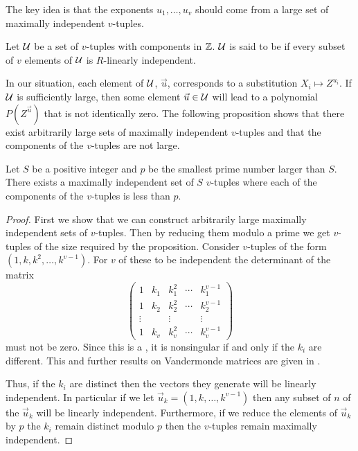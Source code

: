The key idea is that the exponents $u_1, \ldots, u_v$ should come from a
large set of maximally independent $v$-tuples.

\begin{definition}
Let $\cal U$ be a set of $v$-tuples with components in $\mathbb{Z}$.
$\cal U$ is said to be  if every subset of
$v$ elements of $\cal U$ is $R$-linearly independent.
\end{definition}

In our situation, each element of $\cal U$, $\vec{u}$, corresponds to
a substitution $X_i \mapsto Z^{u_i}$.  If ${\cal U}$ is sufficiently
large, then some element $\vec{u} \in {\cal U}$ will lead to a
polynomial $P(Z^{\vec{u}})$ that is not identically zero.  The
following proposition shows that there exist arbitrarily large sets of
maximally independent $v$-tuples and that the components of the
$v$-tuples are not large.

\begin{proposition}
\label{SPMod:Lemma:1:Prop}
Let $S$ be a positive integer and $p$ be the smallest prime number
larger than $S$.  There exists a maximally independent set of $S$
$v$-tuples where each of the components of the $v$-tuples is less than
$p$.
\end{proposition}

\begin{proof}
First we show that we can construct arbitrarily large maximally
independent sets of $v$-tuples.  Then by reducing them modulo a prime
we get $v$-tuples of the size required by the proposition. Consider
$v$-tuples of the form $(1, k, k^2, \ldots, k^{v-1})$.  For $v$ of
these to be independent the determinant of the matrix
\[
\begin{pmatrix}
1& k_1 & k_1^2 & \cdots & k_1^{v-1}\\
1& k_2 & k_2^2 & \cdots & k_2^{v-1}\\
\vdots& &\vdots& & \vdots\\
1& k_v & k_v^2 & \cdots & k_v^{v-1}\end{pmatrix}
\]
must not be zero.  Since this is a , it is
nonsingular if and only if the $k_i$ are different.  This and further
results on Vandermonde matrices are given in
.

Thus, if the $k_i$ are distinct then the vectors they generate will be
linearly independent.  In particular if we let $\vec{u}_k = (1, k,
\ldots, k^{v-1})$ then any subset of $n$ of the $\vec{u}_k$ will be
linearly independent.  Furthermore, if we reduce the elements of $\vec
u_k$ by $p$ the $k_i$ remain distinct modulo $p$ then the $v$-tuples
remain maximally independent.
\end{proof}

